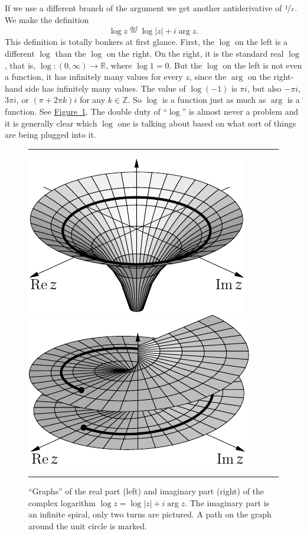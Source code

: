 \documentclass[12pt,openany]{book}
\newcommand{\sabs}[1]{\lvert {#1} \rvert}
\newcommand{\R}{{\mathbb{R}}}
\newcommand{\Z}{{\mathbb{Z}}}
\newcommand{\myquote}[1]{``#1''}
\theoremstyle{plain}
\theoremstyle{remark}
\theoremstyle{definition}
\newenvironment{myfig}{%
\begin{figure}[h!t]
\noindent\rule{\textwidth}{0.5pt}\vspace{12pt}\par\centering}%
{\par\noindent\rule{\textwidth}{0.5pt}
\end{figure}}
\theoremstyle{exercise}
\theoremstyle{example}
\newcommand{\figureref}[1]{\hyperref[#1]{Figure~\ref*{#1}}}
\begin{document}
If we use a different branch of the argument we get another
antiderivative of $\nicefrac{1}{z}$.  We 
make the definition
%
\begin{equation*}
\log z \overset{\text{def}}{=} \log \sabs{z} + i \arg z .
\end{equation*}
This definition is totally bonkers at first glance.  First, the $\log$ on the
left is a different $\log$ than the $\log$ on the right.  On the right, it is the
standard real $\log$, that is, $\log \colon (0,\infty) \to \R$,
where $\log 1 = 0$.
But the $\log$ on the left
is not even a function, it has infinitely many values for every $z$,
since the $\arg$ on the right-hand side has infinitely many values.
The value of $\log (-1)$ is $\pi i$, but also $-\pi i$, $3\pi i$,
or $(\pi + 2\pi k)i$ for any $k \in \Z$.  So $\log$ is a function just as much
as $\arg$ is a function.  See \figureref{fig:loggraph}.
The double duty of \myquote{$\log$} is almost never a
problem and it is generally clear which $\log$ one is talking about based on
what sort of things are being plugged into it.


\begin{myfig}
\includegraphics{figures/logrealgraph}
\qquad
\includegraphics{figures/arggraph2}
\caption{\myquote{Graphs} of the real part (left) and imaginary part (right)
of the complex logarithm $\log z = \log \sabs{z} + i \arg z$.  The imaginary
part is an infinite spiral, only two turns are pictured.  A path on the
graph around the unit circle is marked.\label{fig:loggraph}}
\end{myfig}
\end{document}
